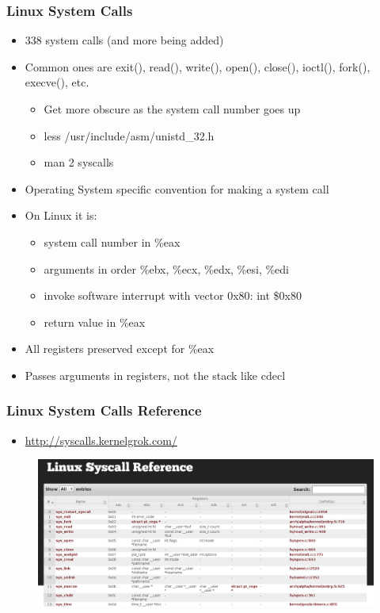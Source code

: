 \documentclass[11pt,xcolor=dvipsnames]{beamer}
\newcommand{\mvs}{\vspace{-0.95em}}
\begin{document}
\begin{frame}[fragile,t]
\frametitle{Linux System Calls}
\mvs
\begin{itemize}
  \item 338 system calls (and more being added)
  \item Common ones are {\ttfamily exit(), read(), write(), open(), close(), ioctl(), fork(), execve()}, etc.
  \pause
  \begin{itemize}
  \item Get more obscure as the system call number goes up
  \item {\ttfamily less /usr/include/asm/unistd\_32.h}
  \item {\ttfamily man 2 syscalls}
  \end{itemize}
  \pause
  \item Operating System specific convention for making a system call
  \item On Linux it is:
  \begin{itemize}
    \item system call number in {\ttfamily \%eax}
    \item arguments in order {\ttfamily \%ebx, \%ecx, \%edx, \%esi, \%edi}
    \item invoke software interrupt with vector {\ttfamily 0x80}: {\ttfamily int \$0x80}
    \item return value in \%eax
  \end{itemize}
  \item All registers preserved except for {\ttfamily \%eax}
  \item Passes arguments in registers, not the stack like {\ttfamily cdecl}
\end{itemize}
\end{frame}

\begin{frame}[fragile,t]
\frametitle{Linux System Calls Reference}
\begin{itemize}
  \item \url{http://syscalls.kernelgrok.com/}
\end{itemize}
\begin{figure}
\centering
\includegraphics[height=0.50\paperheight]{figures/syscalls.png}
\end{figure}
\end{frame}
\end{document}
